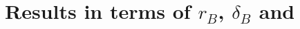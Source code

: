 %
%
%

\section{Results in terms of $r_B$, $\delta_B$ and \Pgamma}
\label{sec:interpretation:gammadini}

